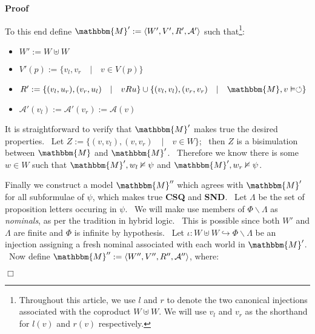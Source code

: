 \documentclass{acmconf}
\newcommand{\assign}{:=}
\newcommand{\tmem}[1]{{\em #1\/}}
\newcommand{\tmtextbf}[1]{{\bfseries{#1}}}
\newenvironment{itemizedot}{\begin{itemize} \renewcommand{\labelitemi}{$\bullet$}\renewcommand{\labelitemii}{$\bullet$}\renewcommand{\labelitemiii}{$\bullet$}\renewcommand{\labelitemiv}{$\bullet$}}{\end{itemize}}
\newenvironment{proof}{\noindent\textbf{Proof\ }}{\hspace*{\fill}$\Box$\medskip}
\begin{document}
\begin{proof}
  
  
  To this end define $\mathbbm{M}' \assign \langle W', V', R', \mathcal{A}'
  \rangle$ such that{\footnote{Throughout this article, we use $l$ and $r$ to
  denote the two canonical injections associated with the coproduct $W \uplus
  W$. We will use $v_l$ and $v_r$ as the shorthand for $l (v)$ and $r (v)$
  respectively.}}: {\hspace*{\fill}}
  \begin{itemizedot}
    \item $W' \assign W \uplus W$
    
    \item $V' (p) \assign \{v_l, v_r \hspace{1em} | \hspace{1em} v \in V
    (p)\}$
    
    \item $R' \assign \{(v_l, u_r), (v_r, u_l) \hspace{1em} | \hspace{1em} v R
    u\} \cup \{(v_l, v_l), (v_r, v_r) \hspace{1em} | \hspace{1em} \mathbbm{M},
    v \vDash \circlearrowleft\}$
    
    \item $\mathcal{A}' (v_l) \assign \mathcal{A}' (v_r) \assign \mathcal{A}
    (v)$
  \end{itemizedot}
  
  
  It is straightforward to verify that $\mathbbm{M}'$ makes true the desired
  properties. \ Let $Z \assign \{(v, v_l), (v, v_r) \hspace{1em} |
  \hspace{1em} v \in W\}$; \ then $Z$ is a bisimulation between $\mathbbm{M}$
  and $\mathbbm{M}'$. \ Therefore we know there is some $w \in W$ such that
  $\mathbbm{M}', w_l \nvDash \psi$ and $\mathbbm{M}', w_r \nvDash \psi$.
  
  
  
  Finally we construct a model $\mathbbm{M}''$ which agrees with
  $\mathbbm{M}'$ for all subformulae of $\psi$, which makes true
  \tmtextbf{CSQ} and \tmtextbf{SND}. \ Let $\Lambda$ be the set of proposition
  letters occuring in $\psi$. \ We will make use members of $\Phi \backslash
  \Lambda$ as {\tmem{nominals}}, as per the tradition in hybrid logic. \ This
  is possible since both $W'$ and $\Lambda$ are finite and $\Phi$ is infinite
  by hypothesis. \ Let $\iota : W \uplus W \hookrightarrow \Phi \backslash
  \Lambda$ be an injection assigning a fresh nominal associated with each
  world in $\mathbbm{M}'$. \ Now define $\mathbbm{M}'' \assign \langle W'',
  V'', R'', \mathcal{A}'' \rangle$, where:
  

\end{proof}
\end{document}
